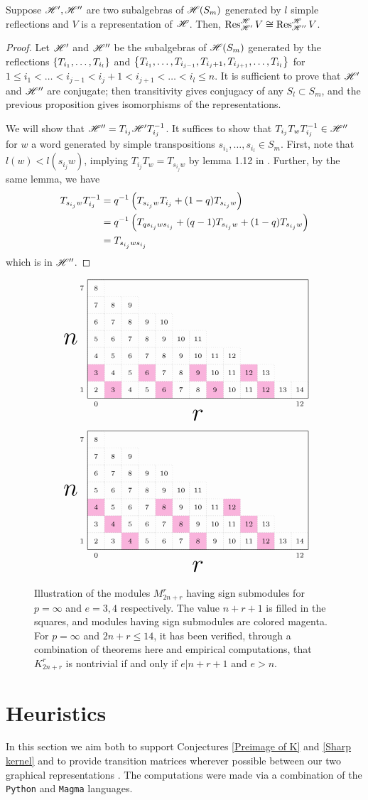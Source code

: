 \documentclass{amsart}
\begin{document}
\begin{corollary}
  Suppose $\mathscr{H}',\mathscr{H}''$ are two subalgebras of $\mathscr{H}(S_m)$ generated by $l$ simple reflections and $V$ is a representation of $\mathscr{H}$.
  Then, $\operatorname{Res}_{\mathscr{H}'}^{\mathscr{H}} V \cong \operatorname{Res}_{\mathscr{H}''}^{\mathscr{H}} V$.
\end{corollary}
\begin{proof}
  Let $\mathscr{H}'$ and $\mathscr{H}''$ be the subalgebras of $\mathscr{H}(S_m)$ generated by the reflections $\left\{ T_{i_1},\dots,T_{i_l} \right\}$ and $\left\{ T_{i_1},\dots,T_{i_{j-1}},T_{i_j + 1},T_{i_{j+1}},\dots,T_{i_l} \right\}$ for $1 \leq i_1 < \dots < i_{j-1} < i_j + 1 < i_{j+1} < \dots < i_l \leq n$.
  It is sufficient to prove that $\mathscr{H}'$ and $\mathscr{H}''$ are conjugate;
  then transitivity gives conjugacy of any $S_l \subset S_m$, and the previous proposition gives isomorphisms of the representations.
 
  We will show that $\mathscr{H}'' = T_{i_j}\mathscr{H}'T_{i_j}^{-1}$.
  It suffices to show that $T_{i_j}T_wT_{i_j}^{-1} \in \mathscr{H}''$ for $w$ a word generated by simple transpositions $s_{i_1},\dots,s_{i_{l}} \in S_m$.
  First, note that $l(w) < l(s_{i_j}w)$, implying $T_{i_j}T_w = T_{s_{i_j}w}$ by lemma 1.12 in \cite{Mathas-book}.
  Further, by the same lemma, we have
  \begin{align*}
    T_{s_{i_j}w}T_{i_j}^{-1} 
    &= q^{-1}\left( T_{s_{i_j}w}T_{i_j} + (1-q)T_{s_{i_j}w} \right)\\
    &= q^{-1}\left( T_{qs_{i_j}ws_{i_j}} + (q-1)T_{s_{i_j}w} + (1-q)T_{s_{i_j}w} \right)\\
    &= T_{s_{i_j}ws_{i_j}}
  \end{align*}
  which is in $\mathscr{H}''$.
\end{proof}

\begin{figure}
  \[
    \ENRGrid{13/7}{2/1,5/1,8/1,11/1,1/2,4/2,7/2,10/2}
  \]\[
    \ENRGrid{13/7}{3/1,7/1,11/1,2/2,6/2,10/2,1/3,5/3,9/3}
  \]
  \caption{
    Illustration of the modules $M_{2n + r}^r$ having sign submodules for $p = \infty$ and $e = 3,4$ respectively.
    The value $n + r + 1$ is filled in the squares, and modules having sign submodules are colored magenta.
    For $p = \infty$ and $2n + r \leq 14$, it has been verified, through a combination of theorems here and empirical computations, that $K_{2n + r}^r$ is nontrivial if and only if $e | n+r+1$ and $e > n$.
  }\label{Empirical Kernel}
\end{figure}


\section{Heuristics}\label{Empirics Section}
In this section we aim both to support Conjectures \ref{Preimage of K} and \ref{Sharp kernel} and to provide transition matrices wherever possible between our two graphical representations \cite{Github}.
The computations were made via a combination of the \texttt{Python} \cite{Python} and \texttt{Magma} \cite{Magma} languages.
\end{document}
